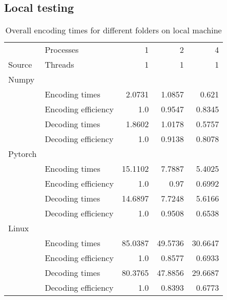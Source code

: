 \subsection{Local testing}
\begin{table}[!h]
	\caption{Overall encoding times for different folders on local machine}
	\begin{tabular}{llrrr}
		\toprule
		\diagbox{}{} & Processes &     1 &        2 &        4 \\
		Source & Threads &     1 &        1 &        1 \\
		\toprule
		Numpy & &  & \\
		\toprule
		& Encoding times &  2.0731 &  1.0857 &  0.621 \\
		\midrule
		& Encoding efficiency &  1.0 &  0.9547 &  0.8345 \\
		\midrule
		& Decoding times & 1.8602 &  1.0178 &  0.5757 \\
		\midrule
		& Decoding efficiency &  1.0 &  0.9138 &  0.8078 \\
		\toprule
		Pytorch & &  & \\
		\toprule
		& Encoding times &  15.1102 &  7.7887 &  5.4025 \\
		\midrule
		& Encoding efficiency  &  1.0 &  0.97 &  0.6992 \\
		\midrule
		& Decoding times  & 14.6897 &  7.7248 &  5.6166 \\
		\midrule
		& Decoding efficiency&  1.0 &  0.9508 &  0.6538 \\
		\toprule
		Linux & &  & \\
		\toprule
		& Encoding times &  85.0387 &  49.5736 &  30.6647 \\
		\midrule
		& Encoding efficiency &  1.0 &  0.8577 &  0.6933 \\
		\midrule
		& Decoding times&  80.3765 &  47.8856 &  29.6687 \\
		\midrule
		& Decoding efficiency&  1.0 &  0.8393 &  0.6773 \\
		\bottomrule
	\end{tabular}
\end{table}
